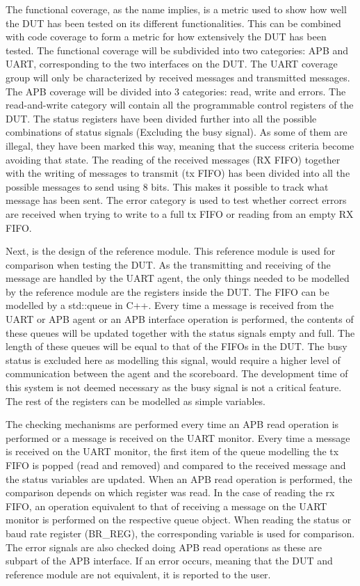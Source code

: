 \documentclass[./dissertation.tex]{subfiles}
\begin{document}
The functional coverage, as the name implies, is a metric used to show how well the DUT has been tested on its different functionalities. This can be combined with code coverage to form a metric for how extensively the DUT has been tested. The functional coverage will be subdivided into two categories: APB and UART, corresponding to the two interfaces on the DUT. The UART coverage group will only be characterized by received messages and transmitted messages. The APB coverage will be divided into 3 categories: read, write and errors. The read-and-write category will contain all the programmable control registers of the DUT. The status registers have been divided further into all the possible combinations of status signals (Excluding the busy signal). As some of them are illegal, they have been marked this way, meaning that the success criteria become avoiding that state. The reading of the received messages (RX FIFO) together with the writing of messages to transmit (tx FIFO) has been divided into all the possible messages to send using 8 bits. This makes it possible to track what message has been sent. The error category is used to test whether correct errors are received when trying to write to a full tx FIFO or reading from an empty RX FIFO. 

Next, is the design of the reference module. This reference module is used for comparison when testing the DUT. As the transmitting and receiving of the message are handled by the UART agent, the only things needed to be modelled by the reference module are the registers inside the DUT. The FIFO can be modelled by a std::queue in C++. Every time a message is received from the UART or APB agent or an APB interface operation is performed, the contents of these queues will be updated together with the status signals empty and full. The length of these queues will be equal to that of the FIFOs in the DUT. The busy status is excluded here as modelling this signal, would require a higher level of communication between the agent and the scoreboard. The development time of this system is not deemed necessary as the busy signal is not a critical feature. The rest of the registers can be modelled as simple variables.

The checking mechanisms are performed every time an APB read operation is performed or a message is received on the UART monitor. Every time a message is received on the UART monitor, the first item of the queue modelling the tx FIFO is popped (read and removed) and compared to the received message and the status variables are updated. When an APB read operation is performed, the comparison depends on which register was read. In the case of reading the rx FIFO, an operation equivalent to that of receiving a message on the UART monitor is performed on the respective queue object. When reading the status or baud rate register (BR\_REG), the corresponding variable is used for comparison. The error signals are also checked doing APB read operations as these are subpart of the APB interface. If an error occurs, meaning that the DUT and reference module are not equivalent, it is reported to the user.
\end{document}
